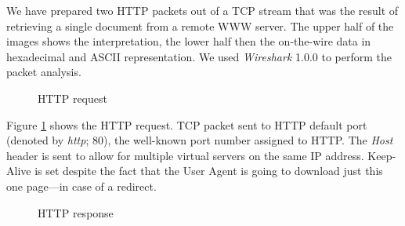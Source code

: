 \documentclass[10pt]{report}
\begin{document}
We have prepared two HTTP packets out of a TCP stream that was the
result of retrieving a single document from a remote WWW server.  The
upper half of the images shows the interpretation, the lower half then
the on-the-wire data in hexadecimal and ASCII representation.  We used
{\em Wireshark} 1.0.0 to perform the packet analysis.

\begin{figure}[p]
    \centering
    \setlength\fboxsep{0pt}
    \setlength\fboxrule{0.5pt}
    \caption{HTTP request}
    \label{httprequest}
\end{figure}

Figure \ref{httprequest} shows the HTTP request.  TCP packet sent to HTTP
default port (denoted by {\em http}; 80), the well-known port number assigned to HTTP.  The {\em Host}
header is sent to allow for multiple virtual servers on the same IP
address.  Keep-Alive is set despite the fact that the User Agent is
going to download just this one page---in case of a redirect.

\begin{figure}[p]
    \centering
    \setlength\fboxsep{0pt}
    \setlength\fboxrule{0.5pt}
    \caption{HTTP response}
    \label{httpresponse}
\end{figure}
\end{document}
